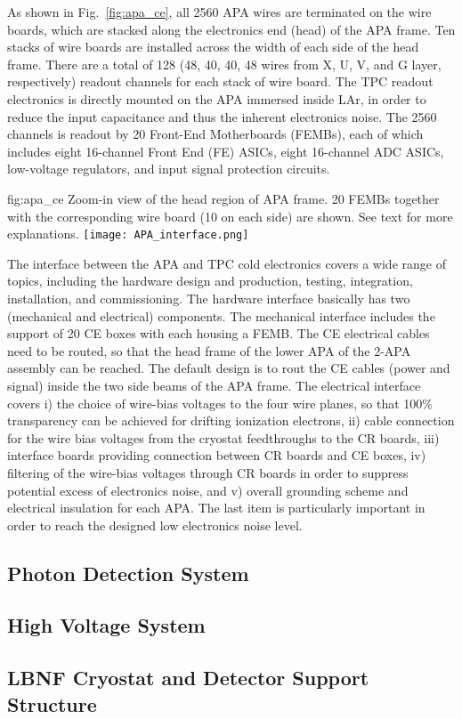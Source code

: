 As shown in Fig.~\ref{fig:apa_ce}, all 2560 APA wires are terminated on the wire boards, which are stacked
along the electronics end (head) of the APA frame. Ten stacks of wire boards are installed across the width 
of each side of the head frame. There are a total of 128 (48, 40, 40, 48 wires from X, U, V, and G layer,
respectively) readout channels for each stack of wire board. The TPC readout electronics is directly
mounted on the APA immersed inside LAr, in order to reduce the input capacitance and thus the inherent
electronics noise. The 2560 channels is readout by 20 Front-End Motherboards (FEMBs), each of which includes
eight 16-channel Front End (FE) ASICs, eight 16-channel ADC ASICs, low-voltage regulators, and input signal 
protection circuits. 

\begin{dunefigure}{fig:apa_ce}
{Zoom-in view of the head region of APA frame. 20  FEMBs together with the corresponding wire board (10 on each side) are shown. See text for more explanations.}
\texttt{[image: APA\_interface.png]}
\end{dunefigure}

The interface between the APA and TPC cold electronics covers a wide range of topics, including the hardware
design and production, testing, integration, installation, and commissioning. The hardware interface basically
has two (mechanical and electrical) components. The mechanical interface includes the support of 20 CE boxes 
with each housing a FEMB. The CE electrical cables need to be routed, so that the head frame of the lower APA
of the 2-APA assembly can be reached. The default design is to rout the CE cables (power and signal) inside the 
two side beams of the APA frame. The electrical interface covers i) the choice of wire-bias voltages to the four 
wire planes, so that 100\% transparency can be achieved for drifting ionization electrons, ii) cable 
connection for the wire bias voltages from the cryostat feedthroughs to the CR boards, iii) interface boards 
providing connection between CR boards and CE boxes, iv) filtering of the wire-bias voltages through CR boards 
in order to suppress potential excess of electronics noise,  and v) overall grounding scheme and electrical 
insulation for each APA. The last item is particularly important in order to reach the designed low 
electronics noise level. 




\subsection{Photon Detection System}
\label{sec:fdsp-apa-intfc-pds}


\subsection{High Voltage System}
\label{sec:fdsp-apa-intfc-hv}


\subsection{LBNF Cryostat and Detector Support Structure}
\label{sec:fdsp-apa-intfc-lbnf-dss}


